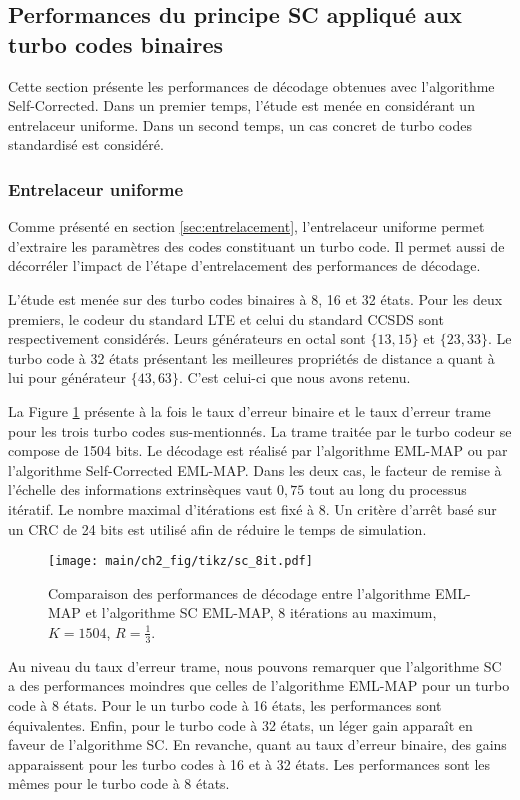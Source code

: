 \subsection{Performances du principe SC appliqué aux turbo codes binaires}
Cette section présente les performances de décodage obtenues avec l'algorithme Self-Corrected. Dans un premier temps, 
l'étude est menée en considérant un entrelaceur uniforme. Dans un second temps, un cas concret de turbo codes standardisé est considéré.
\subsubsection{Entrelaceur uniforme}
Comme présenté en section \ref{sec:entrelacement}, l'entrelaceur uniforme permet d'extraire les paramètres des codes 
constituant un turbo code. Il permet aussi de décorréler l'impact de l'étape d'entrelacement des performances de 
décodage. 

L'étude est menée sur des turbo codes binaires à 8, 16 et 32 états. Pour les deux premiers, le codeur du standard LTE
et celui du standard CCSDS sont respectivement considérés. Leurs générateurs en octal sont $\{13,15\}$ et $\{23,33\}$. Le 
turbo code à 32 états présentant les meilleures propriétés de distance a quant à lui pour générateur $\{43,63\}$. C'est 
celui-ci que nous avons retenu.

La Figure \ref{fig:sc8it} présente à la fois le taux d'erreur binaire et le taux d'erreur trame pour les trois turbo 
codes sus-mentionnés. La trame traitée par le turbo codeur se compose de 1504 bits. Le décodage est réalisé par
l'algorithme EML-MAP ou par l’algorithme Self-Corrected EML-MAP.
Dans les deux cas, le facteur de remise à l'échelle des informations extrinsèques vaut $0,75$ tout au long du processus itératif.
Le nombre maximal d'itérations est fixé à 8. Un critère d'arrêt basé sur un CRC de 24 bits est utilisé afin de réduire le
temps de simulation.

\begin{figure}[!ht]
	\vspace*{-.2cm}
	\centering
	\texttt{[image: main/ch2\_fig/tikz/sc\_8it.pdf]}
	\vspace*{-.1cm}
	\caption{Comparaison des performances de décodage entre l'algorithme EML-MAP et l'algorithme SC EML-MAP, 8 itérations au maximum, $K=1504$, $R=\frac{1}{3}$. \label{fig:sc8it}}
	\vspace*{-.1cm}
\end{figure}

Au niveau du taux d'erreur trame, nous pouvons remarquer que l'algorithme SC a des performances moindres que celles de
l'algorithme EML-MAP pour un turbo code à 8 états. Pour le un turbo code à 16 états, les performances sont équivalentes. 
Enfin, pour le turbo code à 32 états, un léger gain apparaît en faveur de l'algorithme SC.
En revanche, quant au taux d'erreur binaire, des gains apparaissent pour les turbo codes à 16 et à 32 états. Les performances 
sont les mêmes pour le turbo code à 8 états.

